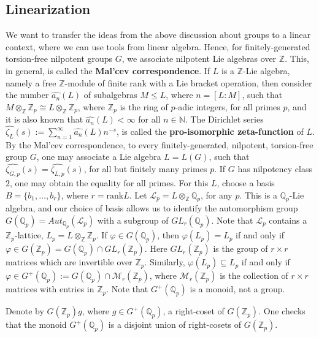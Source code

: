 \documentclass[12pt]{article}
\begin{document}
\subsection{Linearization}
We want to transfer the ideas from the above discussion about groups to a linear context, where we can use tools from linear algebra.
Hence, for finitely-generated torsion-free nilpotent groups $G$, we associate nilpotent Lie algebras over $\mathbb{Z}$. This, in general, is called the \textbf{Mal'cev correspondence}. 
If $L$ is a $\mathbb{Z}$-Lie algebra, namely a free $\mathbb{Z}$-module of finite rank with a Lie bracket operation, then consider the number $\hat{a_n}(L)$ of subalgebras $M\leq L$, where $n=[L:M]$, such that $M\otimes_{\mathbb{Z}}\mathbb{Z}_p\cong L\otimes_{\mathbb{Z}}\mathbb{Z}_p$, where $\mathbb{Z}_p$ is the ring of $p$-adic integers, for all primes $p$, and it is also known that $\hat{a_n}(L)<\infty$ for all $n\in\mathbb{N}$. The Dirichlet series $\hat{\zeta_L}(s):=\sum_{n=1}^{\infty}\hat{a_n}(L)n^{-s}$, is called the \textbf{pro-isomorphic zeta-function} of $L$. By the Mal'cev correspondence, to every finitely-generated, nilpotent, torsion-free group $G$, one may associate a Lie algebra $L=L(G)$, such that $\hat{\zeta_{G,p}}(s)=\hat{\zeta_{L,p}}(s)$, for all but finitely many primes $p$. If $G$ has nilpotency class $2$, one may obtain the equality for all primes. For this $L$, choose a basis $B=\{b_1,\dots,b_r\}$, where $r=\mathrm{rank}L$. Let $\mathcal{L}_{p}=L\otimes_{\mathbb{Z}}\mathbb{Q}_p$, for any $p$. This is a $\mathbb{Q}_p$-Lie algebra, and our choice of basis allows us to identify the automorphism group $G(\mathbb{Q}_p)=Aut_{\mathbb{Q}_p}(\mathcal{L}_{p})$ with a subgroup of $GL_r(\mathbb{Q}_p)$. Note that $\mathcal{L}_{p}$ contains a $\mathbb{Z}_p$-lattice, $L_{p}=L\otimes_{\mathbb{Z}}\mathbb{Z}_p$. If $\varphi\in G(\mathbb{Q}_p)$, then $\varphi(L_{p})=L_{p}$ if and only if $\varphi\in G(\mathbb{Z}_p)=G(\mathbb{Q}_p)\cap GL_r(\mathbb{Z}_p)$. Here $GL_r(\mathbb{Z}_p)$ is the group of $r\times r$ matrices which are invertible over $\mathbb{Z}_p$. Similarly, $\varphi(L_{p})\subseteq L_{p}$ if and only if $\varphi\in G^+(\mathbb{Q}_p):=G(\mathbb{Q}_p)\cap \mathcal{M}_r(\mathbb{Z}_p)$, where $\mathcal{M}_r(\mathbb{Z}_p)$ is the collection of $r\times r$ matrices with entries in $\mathbb{Z}_p$. Note that $G^+(\mathbb{Q}_p)$ is a monoid, not a group.\par
Denote by $G(\mathbb{Z}_p)g$, where $g\in G^+(\mathbb{Q}_p)$, a right-coset of $G(\mathbb{Z}_p)$. One checks that the monoid $G^+(\mathbb{Q}_p)$ is a disjoint union of right-cosets of $G(\mathbb{Z}_p)$.\par
\end{document}
